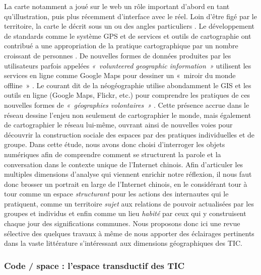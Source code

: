 La carte notamment a joué sur le web un rôle important d’abord en tant qu’illustration, puis plus récemment d’interface avec le réel. Loin d’être figé par le territoire, la carte le décrit sous un ou des angles particuliers \citep{Brunet1987, Jacob1992}. Le développement de standards comme le système GPS \citep{Haklay2008} et de services et outils de cartographie ont contribué a une appropriation de la pratique cartographique par un nombre croissant de personnes \citep{Crampton2009}. De nouvelles formes de données produites par les utilisateurs parfois appelées \textit{« volunteered geographic information »} \citep{Elwood2008} utilisent les services en ligne comme Google Maps pour dessiner un « miroir du monde offline » \citep{Graham2011}. Le courant dit de la néogéographie utilise abondamment le GIS et les outils en ligne (Google Maps, Flickr, etc.) pour comprendre les pratiques de ces nouvelles formes de \textit{« géographies volontaires »} \citep{Turner2006}. Cette présence accrue dans le réseau dessine l’enjeu non seulement de cartographier le monde, mais également de cartographier le réseau lui-même, ouvrant ainsi de nouvelles voies pour découvrir la construction sociale des espaces par des pratiques individuelles et de groupe. Dans cette étude, nous avons donc choisi d’interroger les objets numériques afin de comprendre comment se structurent la parole et la conversation dans le contexte unique de l’Internet chinois. Afin d’articuler les multiples dimensions d’analyse qui viennent enrichir notre réflexion, il nous faut donc brosser un portrait en large de l’Internet chinois, en le considérant tour à tour comme un espace \textit{structurant} pour les actions des internautes qui le pratiquent, comme un territoire \textit{sujet} aux relations de pouvoir actualisées par les groupes et individus et enfin comme un lieu \textit{habité} par ceux qui y construisent chaque jour des significations communes. Nous proposons donc ici une revue sélective des quelques travaux à même de nous apporter des éclairages pertinents dans la vaste littérature s’intéressant aux dimensions géographiques des TIC.

\subsubsection[Code / space : l’espace transductif des TIC]{Code / space : l’espace transductif des TIC}

